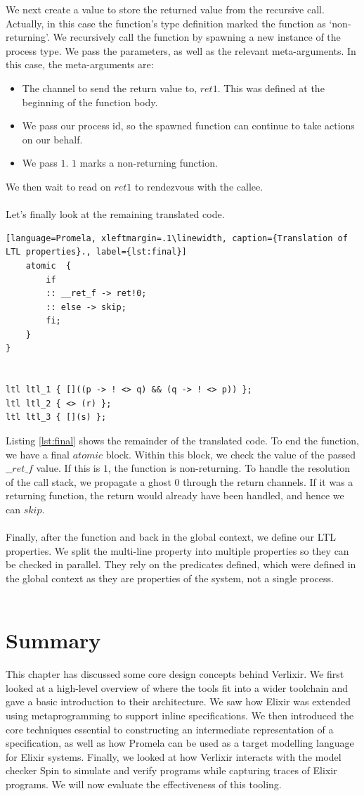 We next create a value to store the returned value from the recursive call. Actually, in this case the function's type definition marked the function as `non-returning'. We recursively call the function by spawning a new instance of the process type. We pass the parameters, as well as the relevant meta-arguments. In this case, the meta-arguments are:
\begin{itemize}
    \item The channel to send the return value to, $ret1$. This was defined at the beginning of the function body.
    \item We pass our process id, so the spawned function can continue to take actions on our behalf.
    \item We pass $1$. $1$ marks a non-returning function.
\end{itemize}
We then wait to read on $ret1$ to rendezvous with the callee.
\\ \\
Let's finally look at the remaining translated code.
\begin{lstlisting}[language=Promela, xleftmargin=.1\linewidth, caption={Translation of LTL properties}., label={lst:final}]
    atomic  {
        if
        :: __ret_f -> ret!0;
        :: else -> skip;
        fi;
    }
}


ltl ltl_1 { []((p -> ! <> q) && (q -> ! <> p)) };
ltl ltl_2 { <> (r) };
ltl ltl_3 { [](s) };
\end{lstlisting}
Listing \ref{lst:final} shows the remainder of the translated code. To end the function, we have a final $atomic$ block. Within this block, we check the value of the passed $\_\_ret\_f$ value. If this is $1$, the function is non-returning. To handle the resolution of the call stack, we propagate a ghost $0$ through the return channels. If it was a returning function, the return would already have been handled, and hence we can $skip$.
\\ \\
Finally, after the function and back in the global context, we define our LTL properties. We split the multi-line property into multiple properties so they can be checked in parallel. They rely on the predicates defined, which were defined in the global context as they are properties of the system, not a single process.
\\ \\
\section{Summary}
This chapter has discussed some core design concepts behind Verlixir. We first looked at a high-level overview of where the tools fit into a wider toolchain and gave a basic introduction to their architecture. We saw how Elixir was extended using metaprogramming to support inline specifications. We then introduced the core techniques essential to constructing an intermediate representation of a specification, as well as how Promela can be used as a target modelling language for Elixir systems. Finally, we looked at how Verlixir interacts with the model checker Spin to simulate and verify programs while capturing traces of Elixir programs. We will now evaluate the effectiveness of this tooling.
